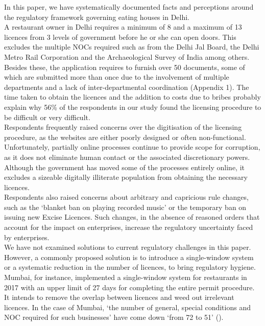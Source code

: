 \documentclass[a4paper, 12pt]{article}
\begin{document}
		In this paper, we have systematically documented facts and perceptions around the regulatory framework governing eating houses in Delhi. \\
		
		A restaurant owner in Delhi requires a minimum of 8 and a maximum of 13 licences from 3 levels of government before he or she can open doors. This excludes the multiple NOCs required such as from the Delhi Jal Board, the Delhi Metro Rail 
Corporation and the Archaeological Survey of India among others. Besides these, the application requires to furnish over 50 documents, some of which are submitted more than once due to the involvement of multiple departments and a lack of inter-departmental 
coordination (Appendix 1). The time taken to obtain the licences and the addition to costs due to bribes probably explain why 56\% of the respondents in our study found the licensing procedure to be difficult or very difficult.\\ 
		
		Respondents frequently raised concerns over the digitisation of the licensing procedure, as the websites are either poorly designed or often non-functional. Unfortunately, partially online processes continue to provide scope for corruption, as it does not 
eliminate human contact or the associated discretionary powers. Although the government has moved some of the processes entirely online, it excludes a sizeable digitally illiterate population from obtaining the necessary licences.\\
		
		Respondents also raised concerns about arbitrary and capricious rule changes, such as the ‘blanket ban on playing recorded music’ or the temporary ban on issuing new Excise Licences. Such changes, in the absence of reasoned orders that account for 
the impact on enterprises, increase the regulatory uncertainty faced by enterprises.\\
		
		We have not examined solutions to current regulatory challenges in this paper. However, a commonly proposed solution is to introduce a single-window system or a systematic reduction in the number of licences, to bring regulatory hygiene. Mumbai, for 
instance, implemented a single-window system for restaurants in 2017 with an upper limit of 27 days for completing the entire permit procedure. It intends to remove the overlap between licences and weed out irrelevant licences. In the case of Mumbai, ‘the number 
of general, special conditions and NOC required for such businesses’ have come down ‘from 72 to 51’ (\cite{nrai2}).\\
		
\end{document}
